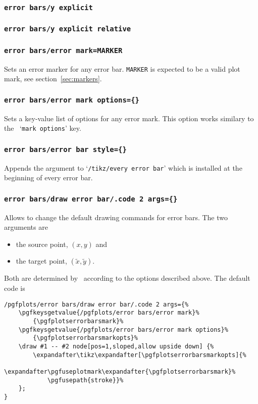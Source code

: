 {\subsubsection{\texttt{error bars/y explicit}}
\subsubsection{\texttt{error bars/y explicit relative}}

\subsubsection{\texttt{error bars/error mark=MARKER}}
Sets an error marker for any error bar. \texttt{MARKER} is expected to be a valid plot mark, see section~\ref{sec:markers}.
\subsubsection{\texttt{error bars/error mark options=\{\}}}
Sets a key-value list of options for any error mark. This option works similary to the \Tikz\ `\texttt{mark options}' key.

\subsubsection{\texttt{error bars/error bar style=\{\}}}
Appends the argument to `\texttt{/tikz/every error bar}' which is installed at the beginning of every error bar.
\subsubsection{\texttt{error bars/draw error bar/.code 2 args=\{\}}}
Allows to change the default drawing commands for error bars. The two arguments are
\begin{itemize} 
\item the source point, $(x,y)$ and
\item the target point, $(\tilde x,\tilde y)$.
\end{itemize}
Both are determined by \PGFPlots\ according to the options described above. The default code is
\begin{lstlisting}[basicstyle=\footnotesize\ttfamily]
/pgfplots/error bars/draw error bar/.code 2 args={%
	\pgfkeysgetvalue{/pgfplots/error bars/error mark}%
		{\pgfplotserrorbarsmark}%
	\pgfkeysgetvalue{/pgfplots/error bars/error mark options}%
		{\pgfplotserrorbarsmarkopts}%
	\draw #1 -- #2 node[pos=1,sloped,allow upside down] {%
		\expandafter\tikz\expandafter[\pgfplotserrorbarsmarkopts]{%
			\expandafter\pgfuseplotmark\expandafter{\pgfplotserrorbarsmark}%
			\pgfusepath{stroke}}%
	};
}
\end{lstlisting}

}
